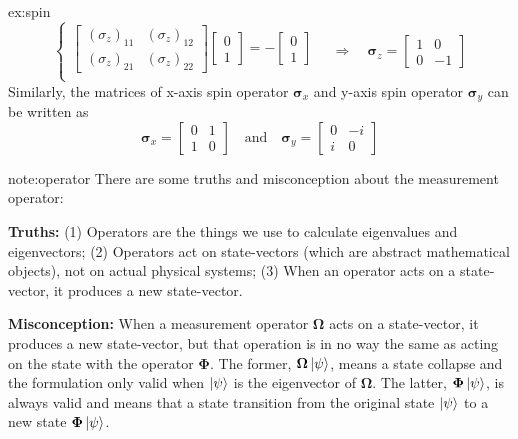 \documentclass{easyclass}
\begin{document}
\begin{itemize}
\begin{example}{ex:spin}
\begin{equation}
\begin{cases}
				\begin{bmatrix}
					(\sigma_z)_{11} & (\sigma_z)_{12}\\
					(\sigma_z)_{21} & (\sigma_z)_{22}
				\end{bmatrix} 
				\begin{bmatrix}
					0 \\ 1
				\end{bmatrix}=
				-\begin{bmatrix}
					0 \\ 1
				\end{bmatrix}\\
			\end{cases}
			\quad \Rightarrow\quad
			\mathbf{\sigma}_z=\begin{bmatrix}
				1 & 0 \\
				0 & -1
			\end{bmatrix}
		\end{equation}
		Similarly, the matrices of x-axis spin operator $\mathbf{\sigma}_x$ and y-axis spin operator $\mathbf{\sigma}_y$ can be written as
		\begin{equation}
			\mathbf{\sigma}_x=\begin{bmatrix}
				0 & 1 \\
				1 & 0
			\end{bmatrix}\quad \textrm{and} \quad
			\mathbf{\sigma}_y=\begin{bmatrix}
				0 & -i \\
				i & 0
			\end{bmatrix}
		\end{equation}
	\end{example}

	\begin{note}{note:operator}
		There are some truths and misconception about the measurement operator:
		
		\textbf{Truths:} (1) Operators are the things we use to calculate eigenvalues and eigenvectors; (2) Operators act on state-vectors (which are abstract mathematical objects), not on actual physical systems; (3) When an operator acts on a state-vector, it produces a new state-vector.
		
		\textbf{Misconception:} When a measurement operator $\mathbf{\Omega}$ acts on a state-vector, it produces a new state-vector, but that operation is in no way the same as acting on the state with the operator $\mathbf{\Phi}$. The former, $\mathbf{\Omega}\ket{\psi}$, means a state collapse and the formulation only valid when $\ket{\psi}$ is the eigenvector of $\mathbf{\Omega}$. The latter, $\mathbf{\Phi}\ket{\psi}$, is always valid and means that a state transition from the original state $\ket{\psi}$ to a new state $\mathbf{\Phi}\ket{\psi}$.
	\end{note}


\end{itemize}
\end{document}
